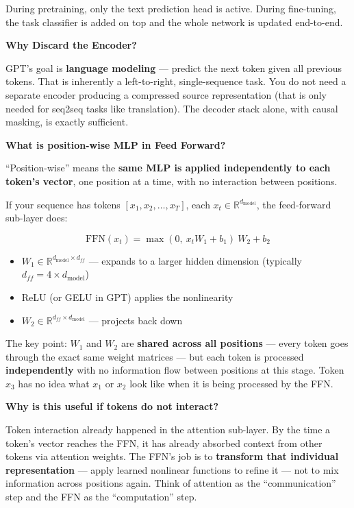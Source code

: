 During pretraining, only the text prediction head is active. During fine-tuning, the task classifier is added on top and the whole network is updated end-to-end.

\medskip
\noindent\textbf{Why Discard the Encoder?}

GPT's goal is \textbf{language modeling} --- predict the next token given all previous tokens. That is inherently a left-to-right, single-sequence task. You do not need a separate encoder producing a compressed source representation (that is only needed for seq2seq tasks like translation). The decoder stack alone, with causal masking, is exactly sufficient.

\bigskip

\textbf{What is position-wise MLP in Feed Forward?}

``Position-wise'' means the \textbf{same MLP is applied independently to each token's vector}, one position at a time, with no interaction between positions.

If your sequence has tokens $[x_1, x_2, \ldots, x_T]$, each $x_t \in \mathbb{R}^{d_{\mathrm{model}}}$, the feed-forward sub-layer does:

\[
\mathrm{FFN}(x_t) = \max(0,\ x_t W_1 + b_1)\ W_2 + b_2
\]

\begin{itemize}
  \item $W_1 \in \mathbb{R}^{d_{\mathrm{model}} \times d_{ff}}$ --- expands to a larger hidden dimension (typically $d_{ff} = 4 \times d_{\mathrm{model}}$)
  \item ReLU (or GELU in GPT) applies the nonlinearity
  \item $W_2 \in \mathbb{R}^{d_{ff} \times d_{\mathrm{model}}}$ --- projects back down
\end{itemize}

The key point: $W_1$ and $W_2$ are \textbf{shared across all positions} --- every token goes through the exact same weight matrices --- but each token is processed \textbf{independently} with no information flow between positions at this stage. Token $x_3$ has no idea what $x_1$ or $x_2$ look like when it is being processed by the FFN.

\medskip
\noindent\textbf{Why is this useful if tokens do not interact?}

Token interaction already happened in the attention sub-layer. By the time a token's vector reaches the FFN, it has already absorbed context from other tokens via attention weights. The FFN's job is to \textbf{transform that individual representation} --- apply learned nonlinear functions to refine it --- not to mix information across positions again. Think of attention as the ``communication'' step and the FFN as the ``computation'' step.

